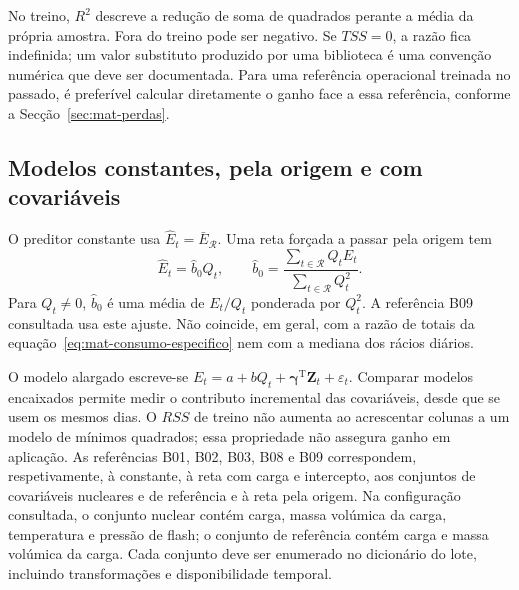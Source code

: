 No treino, $R^2$ descreve a redução de soma de quadrados perante a média da própria amostra. Fora do treino pode ser negativo. Se $TSS=0$, a razão fica indefinida; um valor substituto produzido por uma biblioteca é uma convenção numérica que deve ser documentada. Para uma referência operacional treinada no passado, é preferível calcular diretamente o ganho face a essa referência, conforme a Secção~\ref{sec:mat-perdas}.


\subsection{Modelos constantes, pela origem e com covariáveis}
\label{sec:mat-modelos-comparadores}
O preditor constante usa $\widehat E_t=\bar
E_{\mathcal R}$. Uma reta forçada a passar pela origem tem
\begin{equation}
\widehat E_t=\widehat b_0Q_t,
\qquad \widehat b_0=\frac{\sum_{t\in\mathcal R}Q_tE_t}{\sum_{t\in\mathcal R}Q_t^2}.
\label{eq:mat-origem}
\end{equation}
Para $Q_t\neq0$, $\widehat b_0$ é uma média de $E_t/Q_t$ ponderada por $Q_t^2$. A referência B09 consultada usa este ajuste. Não coincide, em geral, com a razão de totais da equação~\ref{eq:mat-consumo-especifico} nem com a mediana dos rácios diários.

O modelo alargado escreve-se $E_t=a+bQ_t+\boldsymbol\gamma^{\mathrm T}\boldsymbol Z_t+\varepsilon_t$. Comparar modelos encaixados permite medir o contributo incremental das covariáveis, desde que se usem os mesmos dias. O $RSS$ de treino não aumenta ao acrescentar colunas a um modelo de mínimos quadrados; essa propriedade não assegura ganho em aplicação. As referências B01, B02, B03, B08 e B09 correspondem, respetivamente, à constante, à reta com carga e intercepto, aos conjuntos de covariáveis nucleares e de referência e à reta pela origem. Na configuração consultada, o conjunto nuclear contém carga, massa volúmica da carga, temperatura e pressão de flash; o conjunto de referência contém carga e massa volúmica da carga. Cada conjunto deve ser enumerado no dicionário do lote, incluindo transformações e disponibilidade temporal.

